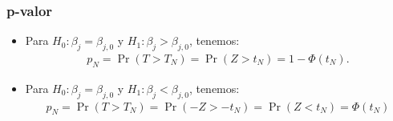 \documentclass[t, compress, spanish, aspectratio=169]{beamer}
\newcommand{\term}[1]{\structure{\textbf{#1}}} %
\begin{document}
\begin{frame}
\frametitle{p-valor}
        \begin{itemize}
            \item Para $H_0: \beta_j = \beta_{j,0}$ y $H_1: \beta_j > \beta_{j,0}$, tenemos:
            \begin{align*}
                p_N=\Pr(T> T_N)=\Pr(Z>t_N)=1-\Phi(t_N).
            \end{align*}
            \item Para $H_0: \beta_j = \beta_{j,0}$ y $H_1: \beta_j < \beta_{j,0}$, tenemos:
            \begin{align*}
                p_N=\Pr(T> T_N)=\Pr(-Z>-t_N)=\Pr(Z< t_N)=\Phi(t_N)
            \end{align*}
        \end{itemize}
\end{frame}
\end{document}
